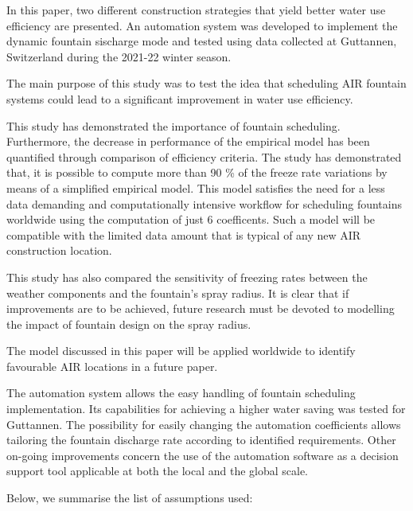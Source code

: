 \documentclass[tc, manuscript]{copernicus}
\begin{document}
\conclusions

In this paper, two different construction strategies that yield better water use efficiency are presented.
An automation system was developed to implement the dynamic fountain sischarge mode and tested using data
collected at Guttannen, Switzerland during the 2021-22 winter season. 

The main purpose of this study was to test the idea that scheduling AIR fountain systems could lead to a
significant improvement in water use efficiency.

This study has demonstrated the importance of fountain scheduling. Furthermore, the decrease in performance of
the empirical model has been quantified through comparison of efficiency criteria. The study has demonstrated
that, it is possible to compute more than 90 \% of the freeze rate variations by means of a simplified empirical
model. This model satisfies the need for a less data demanding and computationally intensive workflow for
scheduling fountains worldwide using the computation of just 6 coefficents. Such a model will be compatible with
the limited data amount that is typical of any new AIR construction location.

This study has also compared the sensitivity of freezing rates between the weather components and the fountain's
spray radius. It is clear that if improvements are to be achieved, future research must be devoted to modelling
the impact of fountain design on the spray radius.

The model discussed in this paper will be applied worldwide to identify favourable AIR locations in a future
paper.


The automation system allows the easy handling of fountain scheduling implementation. Its capabilities for
achieving a higher water saving was tested for Guttannen. The possibility for easily changing the automation
coefficients allows tailoring the fountain discharge rate according to identified requirements. Other on-going
improvements concern the use of the automation software as a decision support tool applicable at both the local
and the global scale.



\appendix

Below, we summarise the list of assumptions used:
\end{document}
